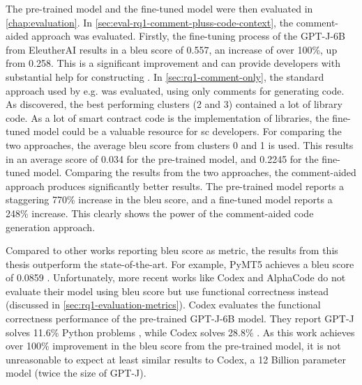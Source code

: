 The pre-trained model and the fine-tuned model were then evaluated in \cref{chap:evaluation}. In \cref{sec:eval-rq1-comment-pluss-code-context}, the comment-aided approach was evaluated. Firstly, the fine-tuning process of the GPT-J-6B from EleutherAI results in a \acrshort{bleu} score of 0.557, an increase of over 100\%, up from 0.258. This is a significant improvement and can provide developers with substantial help for constructing . In \cref{sec:rq1-comment-only}, the standard approach used by e.g. \cite{colin2020pymt5,chen2021codex} was evaluated, using only comments for generating code. As discovered, the best performing clusters (2 and 3) contained a lot of library code. As a lot of smart contract code is the implementation of libraries, the fine-tuned model could be a valuable resource for \acrshort{sc} developers. For comparing the two approaches, the average \acrshort{bleu} score from clusters 0 and 1 is used. This results in an average score of 0.034 for the pre-trained model, and 0.2245 for the fine-tuned model. Comparing the results from the two approaches, the comment-aided approach produces significantly better results. The pre-trained model reports a staggering 770\% increase in the \acrshort{bleu} score, and a fine-tuned model reports a 248\% increase. This clearly shows the power of the comment-aided code generation approach.


Compared to other works reporting \acrshort{bleu} score as metric, the results from this thesis outperform the state-of-the-art. For example, PyMT5 achieves a bleu score of 0.0859 \cite{colin2020pymt5}. Unfortunately, more recent works like Codex and AlphaCode do not evaluate their model using \acrshort{bleu} score but use functional correctness instead (discussed in \cref{sec:rq1-evaluation-metrics}). Codex evaluates the functional correctness performance of the pre-trained GPT-J-6B model. They report GPT-J solves 11.6\% Python problems \cite{chen2021codex}, while Codex solves 28.8\% \cite{chen2021codex}. As this work achieves over 100\% improvement in the \acrshort{bleu} score from the pre-trained model, it is not unreasonable to expect at least similar results to Codex, a 12 Billion parameter model (twice the size of GPT-J). 


